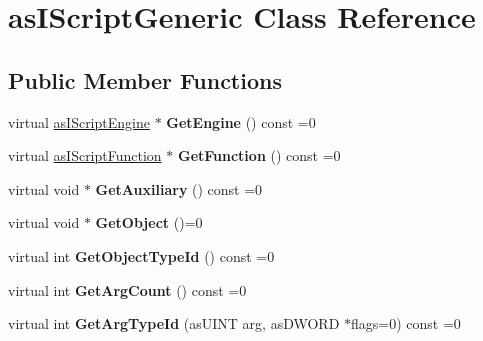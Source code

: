 \hypertarget{classas_i_script_generic}{}\section{as\+I\+Script\+Generic Class Reference}
\label{classas_i_script_generic}
\subsection*{Public Member Functions}
\begin{DoxyCompactItemize}
\item 
\mbox{\label{classas_i_script_generic_a3f3b0838588e3afa7172f9bbb87f5445}} 
virtual \hyperlink{classas_i_script_engine}{as\+I\+Script\+Engine} $\ast$ {\bfseries Get\+Engine} () const =0
\item 
\mbox{\label{classas_i_script_generic_acf00e806a36e0b42686c0f8df25b0898}} 
virtual \hyperlink{classas_i_script_function}{as\+I\+Script\+Function} $\ast$ {\bfseries Get\+Function} () const =0
\item 
\mbox{\label{classas_i_script_generic_adf0ec41b9df5c93d72a950c78f6fea8e}} 
virtual void $\ast$ {\bfseries Get\+Auxiliary} () const =0
\item 
\mbox{\label{classas_i_script_generic_ab9e6627ec3920b1e1576d82586cac84d}} 
virtual void $\ast$ {\bfseries Get\+Object} ()=0
\item 
\mbox{\label{classas_i_script_generic_a3de95071fa358d554137cae88a5229ea}} 
virtual int {\bfseries Get\+Object\+Type\+Id} () const =0
\item 
\mbox{\label{classas_i_script_generic_aafdaf0ed1ff5023b2aaf4ae1adfa3714}} 
virtual int {\bfseries Get\+Arg\+Count} () const =0
\item 
\mbox{\label{classas_i_script_generic_a2bdce6872b371355665e932a962548cb}} 
virtual int {\bfseries Get\+Arg\+Type\+Id} (as\+U\+I\+NT arg, as\+D\+W\+O\+RD $\ast$flags=0) const =0
\item 
\mbox{\label{classas_i_script_generic_a20f30e6ed55ed952bcb5c70096eb83dd}} 

\end{DoxyCompactItemize}
